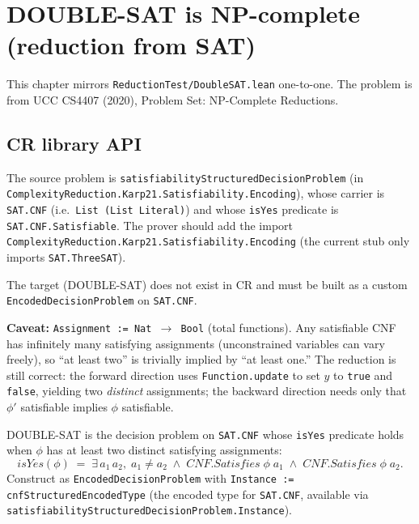 
\section{DOUBLE-SAT is NP-complete (reduction from SAT)}
\label{sec:double_sat}

This chapter mirrors \texttt{ReductionTest/DoubleSAT.lean} one-to-one.
The problem is from UCC CS4407 (2020), Problem Set: NP-Complete Reductions.

\subsection*{CR library API}

The source problem is \texttt{satisfiabilityStructuredDecisionProblem}
(in \texttt{ComplexityReduction.Karp21.Satisfiability.Encoding}), whose
carrier is \texttt{SAT.CNF} (i.e.\ \texttt{List (List Literal)}) and whose
\texttt{isYes} predicate is \texttt{SAT.CNF.Satisfiable}. The prover should
add the import \texttt{ComplexityReduction.Karp21.Satisfiability.Encoding}
(the current stub only imports \texttt{SAT.ThreeSAT}).

The target (DOUBLE-SAT) does not exist in CR and must be built as a custom
\texttt{EncodedDecisionProblem} on \texttt{SAT.CNF}.

\textbf{Caveat:} \texttt{Assignment := Nat $\to$ Bool} (total functions).
Any satisfiable CNF has infinitely many satisfying assignments (unconstrained
variables can vary freely), so ``at least two'' is trivially implied by ``at
least one.'' The reduction is still correct: the forward direction uses
\texttt{Function.update} to set $y$ to \texttt{true} and \texttt{false},
yielding two \emph{distinct} assignments; the backward direction needs only
that $\phi'$ satisfiable implies $\phi$ satisfiable.

\begin{definition}
  \label{def:double_sat}
  DOUBLE-SAT is the decision problem on \texttt{SAT.CNF} whose
  \texttt{isYes} predicate holds when $\phi$ has at least two distinct
  satisfying assignments:
  \[
    \textit{isYes}(\phi) \;=\; \exists\, a_1\, a_2,\; a_1 \neq a_2 \;\wedge\;
      \textit{CNF.Satisfies}\;\phi\;a_1 \;\wedge\;
      \textit{CNF.Satisfies}\;\phi\;a_2.
  \]
  Construct as \texttt{EncodedDecisionProblem} with
  \texttt{Instance := cnfStructuredEncodedType} (the encoded type for
  \texttt{SAT.CNF}, available via \texttt{satisfiabilityStructuredDecisionProblem.Instance}).
\end{definition}

